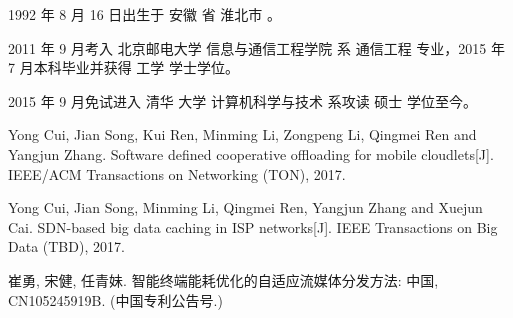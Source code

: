 \begin{resume}


  1992 年 8 月 16 日出生于 安徽 省 淮北市 。

  2011 年 9 月考入 北京邮电大学 信息与通信工程学院 系 通信工程 专业，2015 年 7 月本科毕业并获得 工学 学士学位。

  2015 年 9 月免试进入 清华 大学 计算机科学与技术 系攻读 硕士 学位至今。


%

  \begin{publications}
    \item Yong Cui, Jian Song, Kui Ren, Minming Li, Zongpeng Li, Qingmei Ren and Yangjun Zhang. Software defined cooperative offloading for mobile cloudlets[J]. IEEE/ACM Transactions on Networking (TON), 2017.
    \item Yong Cui, Jian Song, Minming Li, Qingmei Ren, Yangjun Zhang and Xuejun Cai. SDN-based big data caching in ISP networks[J]. IEEE Transactions on Big Data (TBD), 2017.
  \end{publications}

  \begin{achievements}
    \item 崔勇, 宋健, 任青妹. 智能终端能耗优化的自适应流媒体分发方法: 中国, CN105245919B. (中国专利公告号.)
  \end{achievements}

\end{resume}
